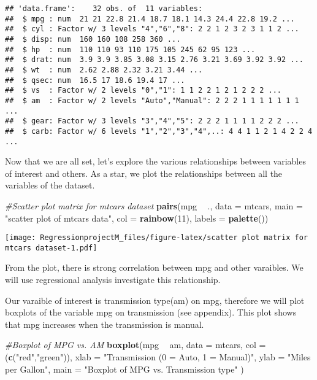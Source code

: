 \documentclass[
]{article}
\newenvironment{Shaded}{\begin{snugshade}}{\end{snugshade}}
\newcommand{\CommentTok}[1]{\textcolor[rgb]{0.56,0.35,0.01}{\textit{#1}}}
\newcommand{\DataTypeTok}[1]{\textcolor[rgb]{0.13,0.29,0.53}{#1}}
\newcommand{\DecValTok}[1]{\textcolor[rgb]{0.00,0.00,0.81}{#1}}
\newcommand{\KeywordTok}[1]{\textcolor[rgb]{0.13,0.29,0.53}{\textbf{#1}}}
\newcommand{\NormalTok}[1]{#1}
\newcommand{\OperatorTok}[1]{\textcolor[rgb]{0.81,0.36,0.00}{\textbf{#1}}}
\newcommand{\StringTok}[1]{\textcolor[rgb]{0.31,0.60,0.02}{#1}}
\begin{document}
\begin{verbatim}
## 'data.frame':    32 obs. of  11 variables:
##  $ mpg : num  21 21 22.8 21.4 18.7 18.1 14.3 24.4 22.8 19.2 ...
##  $ cyl : Factor w/ 3 levels "4","6","8": 2 2 1 2 3 2 3 1 1 2 ...
##  $ disp: num  160 160 108 258 360 ...
##  $ hp  : num  110 110 93 110 175 105 245 62 95 123 ...
##  $ drat: num  3.9 3.9 3.85 3.08 3.15 2.76 3.21 3.69 3.92 3.92 ...
##  $ wt  : num  2.62 2.88 2.32 3.21 3.44 ...
##  $ qsec: num  16.5 17 18.6 19.4 17 ...
##  $ vs  : Factor w/ 2 levels "0","1": 1 1 2 2 1 2 1 2 2 2 ...
##  $ am  : Factor w/ 2 levels "Auto","Manual": 2 2 2 1 1 1 1 1 1 1 ...
##  $ gear: Factor w/ 3 levels "3","4","5": 2 2 2 1 1 1 1 2 2 2 ...
##  $ carb: Factor w/ 6 levels "1","2","3","4",..: 4 4 1 1 2 1 4 2 2 4 ...
\end{verbatim}

Now that we are all set, let's explore the various relationships between
variables of interest and others. As a star, we plot the relationships
between all the variables of the dataset.

\begin{Shaded}
\begin{Highlighting}[]
\CommentTok{#Scatter plot matrix for mtcars dataset}
\KeywordTok{pairs}\NormalTok{(mpg }\OperatorTok{~}\StringTok{ }\NormalTok{., }\DataTypeTok{data =}\NormalTok{ mtcars, }\DataTypeTok{main =} \StringTok{"scatter plot of mtcars data"}\NormalTok{, }\DataTypeTok{col =} \KeywordTok{rainbow}\NormalTok{(}\DecValTok{11}\NormalTok{), }\DataTypeTok{labels =} \KeywordTok{palette}\NormalTok{())}
\end{Highlighting}
\end{Shaded}

\texttt{[image: RegressionprojectM\_files/figure-latex/scatter plot matrix for mtcars dataset-1.pdf]}

From the plot, there is strong correlation between mpg and other
varaibles. We will use regressional analysis investigate this
relationship.

Our varaible of interest is transmission type(am) on mpg, therefore we
will plot boxplots of the variable mpg on transmission (see appendix).
This plot shows that mpg increases when the transmission is manual.

\begin{Shaded}
\begin{Highlighting}[]
\CommentTok{#Boxplot of MPG vs. AM}
\KeywordTok{boxplot}\NormalTok{(mpg }\OperatorTok{~}\StringTok{ }\NormalTok{am, }\DataTypeTok{data =}\NormalTok{ mtcars, }\DataTypeTok{col =}\NormalTok{ (}\KeywordTok{c}\NormalTok{(}\StringTok{"red"}\NormalTok{,}\StringTok{"green"}\NormalTok{)), }\DataTypeTok{xlab =} \StringTok{"Transmission (0 = Auto, 1 = Manual)"}\NormalTok{, }\DataTypeTok{ylab =} \StringTok{"Miles per Gallon"}\NormalTok{, }\DataTypeTok{main =} \StringTok{"Boxplot of MPG vs. Transmission type"}\NormalTok{ )}
\end{Highlighting}
\end{Shaded}
\end{document}
